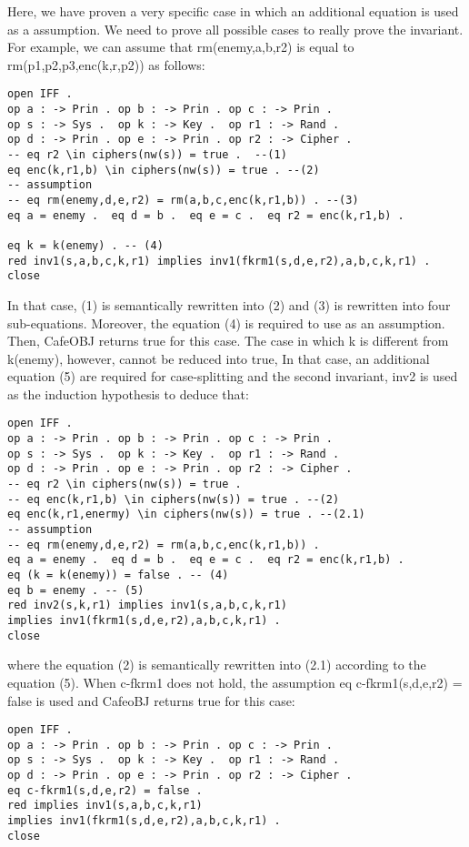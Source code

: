 \documentclass[a4paper,fleqn]{cas-dc}
\begin{document}
Here, we have proven a very specific case in which an additional equation is used as a assumption. We need to prove all possible cases to really prove the invariant. For example, we can assume that rm(enemy,a,b,r2) is equal to rm(p1,p2,p3,enc(k,r,p2)) as follows: 
\begin{small}
\begin{verbatim}
open IFF .
op a : -> Prin . op b : -> Prin . op c : -> Prin .
op s : -> Sys .  op k : -> Key .  op r1 : -> Rand .
op d : -> Prin . op e : -> Prin . op r2 : -> Cipher .
-- eq r2 \in ciphers(nw(s)) = true .  --(1)
eq enc(k,r1,b) \in ciphers(nw(s)) = true . --(2)
-- assumption
-- eq rm(enemy,d,e,r2) = rm(a,b,c,enc(k,r1,b)) . --(3)
eq a = enemy .  eq d = b .  eq e = c .  eq r2 = enc(k,r1,b) .

eq k = k(enemy) . -- (4)
red inv1(s,a,b,c,k,r1) implies inv1(fkrm1(s,d,e,r2),a,b,c,k,r1) .
close
\end{verbatim}
\end{small}
In that case, (1) is semantically rewritten into (2) and (3) is rewritten into four sub-equations. Moreover, the equation (4) is required to use as an assumption. Then, CafeOBJ returns true for this case. The case in which k is different from k(enemy), however, cannot be reduced into true, In that case, an additional equation (5) are required for case-splitting and the second invariant, inv2 is used as the induction hypothesis to deduce that:
\begin{small}
\begin{verbatim}
open IFF .
op a : -> Prin . op b : -> Prin . op c : -> Prin .
op s : -> Sys .  op k : -> Key .  op r1 : -> Rand .
op d : -> Prin . op e : -> Prin . op r2 : -> Cipher .
-- eq r2 \in ciphers(nw(s)) = true .  
-- eq enc(k,r1,b) \in ciphers(nw(s)) = true . --(2)
eq enc(k,r1,enermy) \in ciphers(nw(s)) = true . --(2.1)
-- assumption
-- eq rm(enemy,d,e,r2) = rm(a,b,c,enc(k,r1,b)) . 
eq a = enemy .  eq d = b .  eq e = c .  eq r2 = enc(k,r1,b) .
eq (k = k(enemy)) = false . -- (4)
eq b = enemy . -- (5)
red inv2(s,k,r1) implies inv1(s,a,b,c,k,r1) 
implies inv1(fkrm1(s,d,e,r2),a,b,c,k,r1) .
close
\end{verbatim}
\end{small}
where the equation (2) is semantically rewritten into (2.1) according to the equation (5). When c-fkrm1 does not hold, the assumption eq c-fkrm1(s,d,e,r2) = false is used and CafeoBJ returns true for this case:
\begin{small}
\begin{verbatim}
open IFF .
op a : -> Prin . op b : -> Prin . op c : -> Prin .
op s : -> Sys .  op k : -> Key .  op r1 : -> Rand .
op d : -> Prin . op e : -> Prin . op r2 : -> Cipher .
eq c-fkrm1(s,d,e,r2) = false .
red implies inv1(s,a,b,c,k,r1) 
implies inv1(fkrm1(s,d,e,r2),a,b,c,k,r1) .
close
\end{verbatim}
\end{small}
\end{document}
